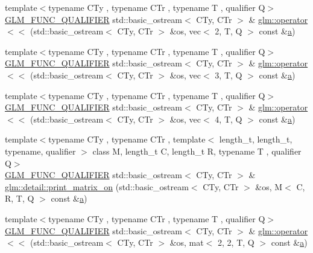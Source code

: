 \begin{DoxyCompactItemize}
\item 
{\footnotesize template$<$typename C\+Ty , typename C\+Tr , typename T , qualifier Q$>$ }\\\mbox{\hyperlink{setup_8hpp_a33fdea6f91c5f834105f7415e2a64407}{G\+L\+M\+\_\+\+F\+U\+N\+C\+\_\+\+Q\+U\+A\+L\+I\+F\+I\+ER}} std\+::basic\+\_\+ostream$<$ C\+Ty, C\+Tr $>$ \& \mbox{\hyperlink{group__gtx__io_ga164ed8df8315066e091df1987617f188}{glm\+::operator$<$$<$}} (std\+::basic\+\_\+ostream$<$ C\+Ty, C\+Tr $>$ \&os, vec$<$ 2, T, Q $>$ const \&\mbox{\hyperlink{_s_d_l__opengl__glext_8h_a3309789fc188587d666cda5ece79cf82}{a}})
\item 
{\footnotesize template$<$typename C\+Ty , typename C\+Tr , typename T , qualifier Q$>$ }\\\mbox{\hyperlink{setup_8hpp_a33fdea6f91c5f834105f7415e2a64407}{G\+L\+M\+\_\+\+F\+U\+N\+C\+\_\+\+Q\+U\+A\+L\+I\+F\+I\+ER}} std\+::basic\+\_\+ostream$<$ C\+Ty, C\+Tr $>$ \& \mbox{\hyperlink{group__gtx__io_ga367fccf3eb4c54a7624e628b6131e76d}{glm\+::operator$<$$<$}} (std\+::basic\+\_\+ostream$<$ C\+Ty, C\+Tr $>$ \&os, vec$<$ 3, T, Q $>$ const \&\mbox{\hyperlink{_s_d_l__opengl__glext_8h_a3309789fc188587d666cda5ece79cf82}{a}})
\item 
{\footnotesize template$<$typename C\+Ty , typename C\+Tr , typename T , qualifier Q$>$ }\\\mbox{\hyperlink{setup_8hpp_a33fdea6f91c5f834105f7415e2a64407}{G\+L\+M\+\_\+\+F\+U\+N\+C\+\_\+\+Q\+U\+A\+L\+I\+F\+I\+ER}} std\+::basic\+\_\+ostream$<$ C\+Ty, C\+Tr $>$ \& \mbox{\hyperlink{group__gtx__io_ga6ce60b96203d549182f4df029007fb94}{glm\+::operator$<$$<$}} (std\+::basic\+\_\+ostream$<$ C\+Ty, C\+Tr $>$ \&os, vec$<$ 4, T, Q $>$ const \&\mbox{\hyperlink{_s_d_l__opengl__glext_8h_a3309789fc188587d666cda5ece79cf82}{a}})
\item 
{\footnotesize template$<$typename C\+Ty , typename C\+Tr , template$<$ length\+\_\+t, length\+\_\+t, typename, qualifier $>$ class M, length\+\_\+t C, length\+\_\+t R, typename T , qualifier Q$>$ }\\\mbox{\hyperlink{setup_8hpp_a33fdea6f91c5f834105f7415e2a64407}{G\+L\+M\+\_\+\+F\+U\+N\+C\+\_\+\+Q\+U\+A\+L\+I\+F\+I\+ER}} std\+::basic\+\_\+ostream$<$ C\+Ty, C\+Tr $>$ \& \mbox{\hyperlink{namespaceglm_1_1detail_a45b170ea667900227c6849ad1dfe1bf5}{glm\+::detail\+::print\+\_\+matrix\+\_\+on}} (std\+::basic\+\_\+ostream$<$ C\+Ty, C\+Tr $>$ \&os, M$<$ C, R, T, Q $>$ const \&\mbox{\hyperlink{_s_d_l__opengl__glext_8h_a3309789fc188587d666cda5ece79cf82}{a}})
\item 
{\footnotesize template$<$typename C\+Ty , typename C\+Tr , typename T , qualifier Q$>$ }\\\mbox{\hyperlink{setup_8hpp_a33fdea6f91c5f834105f7415e2a64407}{G\+L\+M\+\_\+\+F\+U\+N\+C\+\_\+\+Q\+U\+A\+L\+I\+F\+I\+ER}} std\+::basic\+\_\+ostream$<$ C\+Ty, C\+Tr $>$ \& \mbox{\hyperlink{group__gtx__io_ga9793fc7111cd7d145c369827071f5091}{glm\+::operator$<$$<$}} (std\+::basic\+\_\+ostream$<$ C\+Ty, C\+Tr $>$ \&os, mat$<$ 2, 2, T, Q $>$ const \&\mbox{\hyperlink{_s_d_l__opengl__glext_8h_a3309789fc188587d666cda5ece79cf82}{a}})

\end{DoxyCompactItemize}
